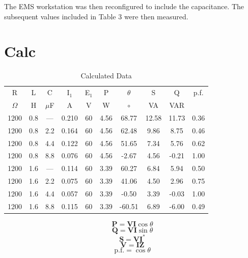 \documentclass{article}
\begin{document}
The EMS workstation was then reconfigured to include the capacitance.
The subsequent values included in Table 3 were then measured.

\section{Calc}
\begin{table}[h]
  \begin{center}
    \begin{tabular}{cccccccccc}
      \hline
      R & L & C & I$_1$ & E$_1$ & P & $\theta$ & S & Q & p.f. \\
      $\Omega$ & H & $\mu$F & A & V & W & $\circ$ & VA & VAR & \\
      \hline
      1200 & 0.8 & --- & 0.210 & 60 & 4.56 &  68.77 & 12.58 & 11.73 & 0.36 \\
      1200 & 0.8 & 2.2 & 0.164 & 60 & 4.56 &  62.48 &  9.86 &  8.75 & 0.46 \\
      1200 & 0.8 & 4.4 & 0.122 & 60 & 4.56 &  51.65 &  7.34 &  5.76 & 0.62 \\
      1200 & 0.8 & 8.8 & 0.076 & 60 & 4.56 &  -2.67 &  4.56 & -0.21 & 1.00 \\
      1200 & 1.6 & --- & 0.114 & 60 & 3.39 &  60.27 &  6.84 &  5.94 & 0.50 \\
      1200 & 1.6 & 2.2 & 0.075 & 60 & 3.39 &  41.06 &  4.50 &  2.96 & 0.75 \\
      1200 & 1.6 & 4.4 & 0.057 & 60 & 3.39 &  -0.50 &  3.39 & -0.03 & 1.00 \\
      1200 & 1.6 & 8.8 & 0.115 & 60 & 3.39 & -60.51 &  6.89 & -6.00 & 0.49 \\
      \hline
    \end{tabular}
    \caption{Calculated Data}
    \label{calc_dat}
  \end{center}
\end{table}

\[\mathbf{P} = \mathbf{VI}\cos\theta \]
\[\mathbf{Q} = \mathbf{VI}\sin\theta\]
\[\mathbf{S} = \mathbf{VI}^*\]
\[\mathbf{V} = \mathbf{IZ}\]
\[\text{p.f.} = \cos\theta\]
\end{document}
